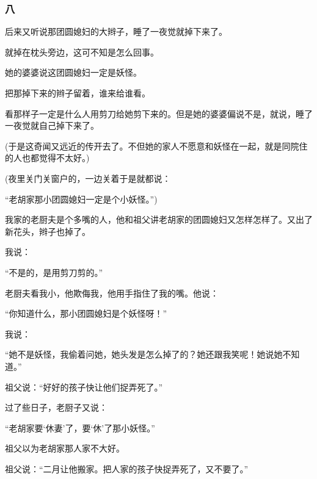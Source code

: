 \subsubsection*{八}
\par 后来又听说那团圆媳妇的大辫子，睡了一夜觉就掉下来了。
\par 就掉在枕头旁边，这可不知是怎么回事。
\par 她的婆婆说这团圆媳妇一定是妖怪。
\par 把那掉下来的辫子留着，谁来给谁看。
\par 看那样子一定是什么人用剪刀给她剪下来的。但是她的婆婆偏说不是，就说，睡了一夜觉就自己掉下来了。
\par (于是这奇闻又远近的传开去了。不但她的家人不愿意和妖怪在一起，就是同院住的人也都觉得不太好。)
\par (夜里关门关窗户的，一边关着于是就都说：
\par “老胡家那小团圆媳妇一定是个小妖怪。”)
\par 我家的老厨夫是个多嘴的人，他和祖父讲老胡家的团圆媳妇又怎样怎样了。又出了新花头，辫子也掉了。
\par 我说：
\par “不是的，是用剪刀剪的。”
\par 老厨夫看我小，他欺侮我，他用手指住了我的嘴。他说：
\par “你知道什么，那小团圆媳妇是个妖怪呀！”
\par 我说：
\par “她不是妖怪，我偷着问她，她头发是怎么掉了的？她还跟我笑呢！她说她不知道。”
\par 祖父说：“好好的孩子快让他们捉弄死了。”
\par 过了些日子，老厨子又说：
\par “老胡家要‘休妻’了，要‘休’了那小妖怪。”
\par 祖父以为老胡家那人家不大好。
\par 祖父说：“二月让他搬家。把人家的孩子快捉弄死了，又不要了。”
